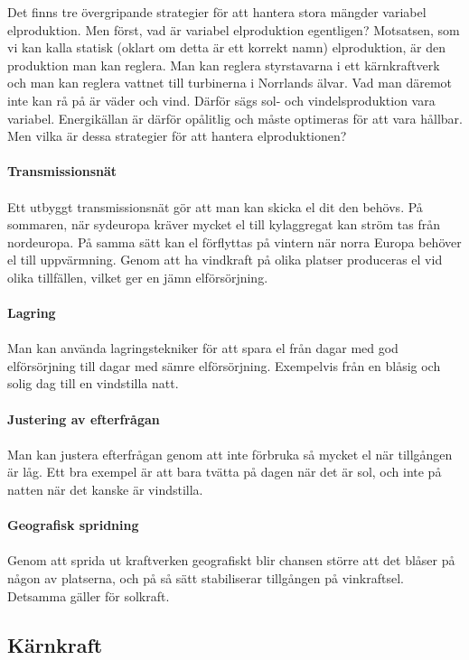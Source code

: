 \documentclass{article}
\begin{document}
Det finns tre övergripande strategier för att hantera stora mängder variabel elproduktion. Men först, vad är variabel elproduktion egentligen? Motsatsen, som vi kan kalla statisk (oklart om detta är ett korrekt namn) elproduktion, är den produktion man kan reglera. Man kan reglera styrstavarna i ett kärnkraftverk och man kan reglera vattnet till turbinerna i Norrlands älvar. Vad man däremot inte kan rå på är väder och vind. Därför sägs sol- och vindelsproduktion vara variabel. Energikällan är därför opålitlig och måste optimeras för att vara hållbar. Men vilka är dessa strategier för att hantera elproduktionen?\\
\\
\textbf{Transmissionsnät}\\
\\
Ett utbyggt transmissionsnät gör att man kan skicka el dit den behövs. På sommaren, när sydeuropa kräver mycket el till kylaggregat kan ström tas från nordeuropa. På samma sätt kan el förflyttas på vintern när norra Europa behöver el till uppvärmning. Genom att ha vindkraft på olika platser produceras el vid olika tillfällen, vilket ger en jämn elförsörjning.\\
\\
\textbf{Lagring}\\
\\
Man kan använda lagringstekniker för att spara el från dagar med god elförsörjning till dagar med sämre elförsörjning. Exempelvis från en blåsig och solig dag till en vindstilla natt.\\
\\
\textbf{Justering av efterfrågan}\\
\\
Man kan justera efterfrågan genom att inte förbruka så mycket el när tillgången är låg. Ett bra exempel är att bara tvätta på dagen när det är sol, och inte på natten när det kanske är vindstilla.\\
\\
\textbf{Geografisk spridning}\\
\\
Genom att sprida ut kraftverken geografiskt blir chansen större att det blåser på någon av platserna, och på så sätt stabiliserar tillgången på vinkraftsel. Detsamma gäller för solkraft.

\subsection{Kärnkraft}
\end{document}

